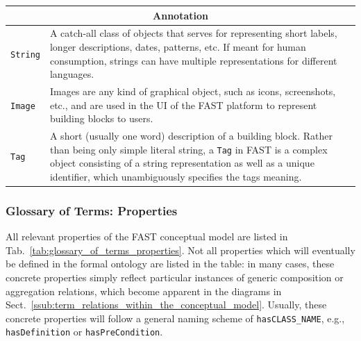 \documentclass[twoside]{fast_latex}
\begin{document}
\begin{small}
\begin{longtable}{|p{4.25cm}|p{10cm}|}
\multicolumn{2}{|c|}{\textbf{Annotation}} \\ \hline
\texttt{String} & A catch-all class of objects that serves for representing short labels, longer descriptions, dates, patterns, etc. If meant for human consumption, strings can have multiple representations for different languages. \\ \hline
\texttt{Image} & Images are any kind of graphical object, such as icons, screenshots, etc., and are used in the UI of the FAST platform to represent building blocks to users. \\ \hline
\texttt{Tag} & A short (usually one word) description of a building block. Rather than being only simple literal string, a \texttt{Tag} in FAST is a complex object consisting of a string representation as well as a unique identifier, which unambiguously specifies the tags meaning. \\ \hline
\end{longtable}
\end{small}
\doublespacing


\subsubsection{Glossary of Terms: Properties} %
\label{subs:properties}

All relevant properties of the FAST conceptual model are listed in Tab.~\ref{tab:glossary_of_terms_properties}. Not all properties which will eventually be defined in the formal ontology are listed in the table: in many cases, these concrete properties simply reflect particular instances of generic composition or aggregation relations, which become apparent in the diagrams in Sect.~\ref{ssub:term_relations_within_the_conceptual_model}. Usually, these concrete properties will follow a general naming scheme of \texttt{hasCLASS\_NAME}, e.g., \texttt{hasDefinition} or \texttt{hasPreCondition}.
\end{document}
